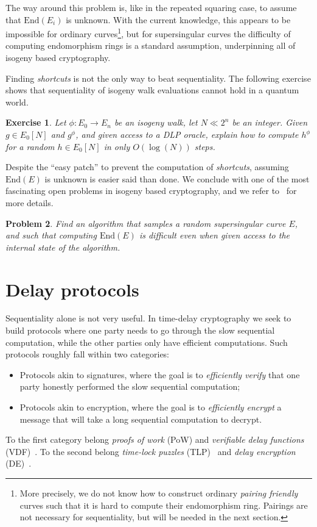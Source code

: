 \documentclass{article}
\newtheorem{ex}{Exercise}
\newtheorem{prob}[ex]{Problem}
\def\End{\mathrm{End}}
\begin{document}
The way around this problem is, like in the repeated squaring case, to
assume that $\End(E_i)$ is unknown.  With the current knowledge, this
appears to be impossible for ordinary curves\footnote{More precisely,
  we do not know how to construct ordinary \emph{pairing friendly}
  curves such that it is hard to compute their endomorphism ring.
  Pairings are not necessary for sequentiality, but will be needed in
  the next section.}, but for supersingular curves the difficulty of
computing endomorphism rings is a standard assumption, underpinning
all of isogeny based cryptography.

Finding \emph{shortcuts} is not the only way to beat sequentiality.
The following exercise shows that sequentiality of isogeny walk
evaluations cannot hold in a quantum world.

\begin{ex}
  Let $\phi:E_0\to E_n$ be an isogeny walk, let $N\ll 2^n$ be an
  integer.  Given $g\in E_0[N]$ and $g^\phi$, and given access to a
  DLP oracle, explain how to compute $h^\phi$ for a random
  $h\in E_0[N]$ in only $O(\log(N))$ steps.
\end{ex}

Despite the ``easy patch'' to prevent the computation of
\emph{shortcuts}, assuming $\End(E)$ is unknown is easier said than
done.  We conclude with one of the most fascinating open problems in
isogeny based cryptography, and we refer
to~\cite{AC:DMPS19,EPRINT:BurDeF20} for more details.

\begin{prob}
  Find an algorithm that samples a random supersingular curve $E$, and
  such that computing $\End(E)$ is difficult even when given access to
  the internal state of the algorithm.
\end{prob}


\section{Delay protocols}

Sequentiality alone is not very useful.  In time-delay cryptography we
seek to build protocols where one party needs to go through the slow
sequential computation, while the other parties only have efficient
computations.  Such protocols roughly fall within two categories:
\begin{itemize}
\item Protocols akin to signatures, where the goal is to
  \emph{efficiently verify} that one party honestly performed the slow
  sequential computation;
\item Protocols akin to encryption, where the goal is to
  \emph{efficiently encrypt} a message that will take a long
  sequential computation to decrypt.
\end{itemize}
To the first category belong \emph{proofs of work} (PoW) and
\emph{verifiable delay functions} (VDF)~\cite{C:BBBF18}.  To the
second belong \emph{time-lock puzzles} (TLP)~\cite{TLP} and
\emph{delay encryption} (DE)~\cite{EPRINT:BurDeF20}.
\end{document}
